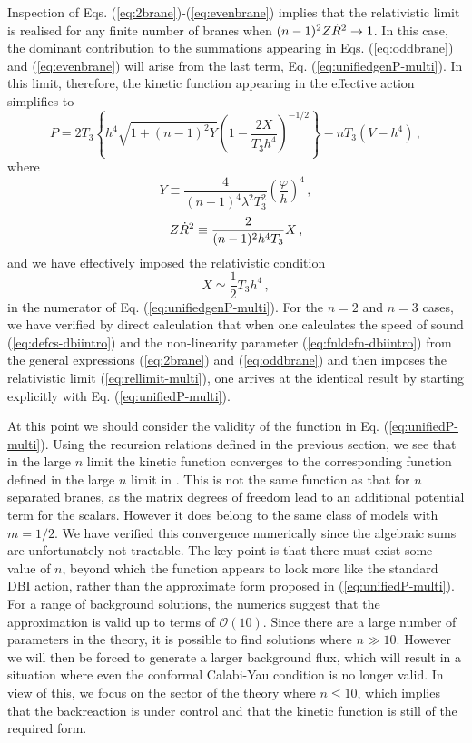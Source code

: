 Inspection of Eqs. (\ref{eq:2brane})-(\ref{eq:evenbrane}) implies that 
the relativistic limit is realised for any finite number of branes when 
$(n-1)^2 Z\dot{R}^2 \rightarrow 1$. In this case, the dominant contribution 
to the summations appearing in Eqs. (\ref{eq:oddbrane}) and (\ref{eq:evenbrane})
will arise from the last term, Eq. (\ref{eq:unifiedgenP-multi}). In this limit, 
therefore, the kinetic function appearing in the effective action simplifies to 
% 
\begin{equation}
\label{eq:unifiedP-multi}
P = 2T_3 \left\{ h^4 \sqrt{1+(n-1)^2Y} 
\left( 1- \frac{2X}{T_3h^4} \right)^{-1/2} 
 \right\} - n T_3 \left(V - h^4 \right) \,,
\end{equation}
% 
where 
% 
\begin{equation}
\label{eq:defY-multi}
Y \equiv \frac{4}{(n-1)^4 \lambda^2 T_3^2} \left( \frac{\varphi}{h} \right)^4 \,,
\end{equation}
% 
\begin{equation}
\label{eq:defXR2-multi}
Z\dot{R}^2 \equiv \frac{2}{(n-1)^2 h^4 T_3}X \,,
\end{equation} 
% 
and we have effectively imposed the relativistic condition 
% 
\begin{equation}
\label{eq:rellimit-multi}
X \simeq \frac{1}{2} T_3 h^4 \,,
\end{equation}
% 
in the numerator of Eq. (\ref{eq:unifiedgenP-multi}).  
For the $n=2$ and $n=3$ cases, we have verified by direct 
calculation that when one calculates the speed of sound 
(\ref{eq:defcs-dbiintro}) and the non-linearity parameter 
(\ref{eq:fnldefn-dbiintro}) from the general expressions (\ref{eq:2brane}) and (\ref{eq:oddbrane}) 
and then imposes the relativistic
limit (\ref{eq:rellimit-multi}), one arrives at the identical result 
by starting explicitly with Eq. (\ref{eq:unifiedP-multi}).


At this point we should consider the validity of 
the function in Eq. (\ref{eq:unifiedP-multi}). Using the
recursion relations defined in the previous section, 
we see that in the large $n$ limit the kinetic function converges to 
the corresponding function defined in the large $n$ 
limit in \cite{thomasward}. This is not the same function as that for
$n$ separated branes, as the matrix degrees of freedom 
lead to an additional potential term for the scalars. However it does belong
to the same class of models with $m=1/2$. We have 
verified this convergence numerically since the algebraic sums are
unfortunately not tractable. The key point is that there must exist some 
value of $n$, beyond which the function appears to look
more like the standard DBI action, rather than the 
approximate form proposed in (\ref{eq:unifiedP-multi}). For a range of background 
solutions, the numerics suggest that the approximation is 
valid up to terms of $\mathcal{O}(10)$. Since there are a large number of 
parameters in the theory, it is possible to find solutions 
where $n \gg 10$. However we will then be forced to 
generate a larger background flux, which will result 
in a situation where even the conformal 
Calabi-Yau condition is no longer valid. In view of this, we focus on
the sector of the theory where $n \le 10$, which implies that the 
backreaction is under control and that the kinetic function
is still of the required form. 


